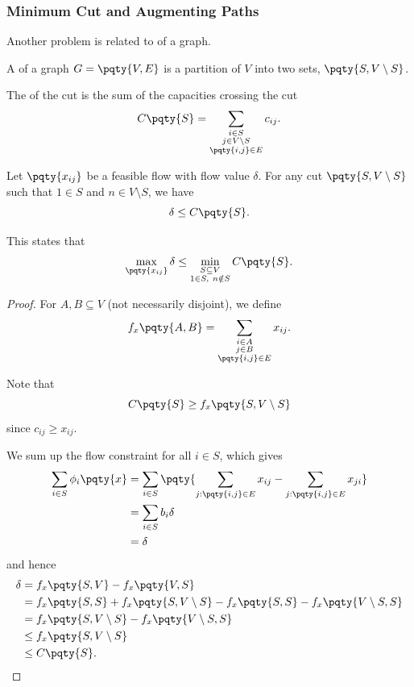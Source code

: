 \subsubsection{Minimum Cut and Augmenting Paths}

Another problem is related to  of a graph.

\begin{definition}
    A  of a graph \(G = \pqty{V, E}\) is a partition of \(V\) into two sets, \(\pqty{S, V \setminus S}\).
    
    The  of the cut is the sum of the capacities crossing the cut
    \[
        C\pqty{S} = \sum_{\substack{i \in S \\ j \in V \setminus S \\ \pqty{i, j} \in E}} c_{ij}.
    \]
\end{definition}

\begin{theorem}
    Let \(\pqty{x_{ij}}\) be a feasible flow with flow value \(\delta\). For any cut \(\pqty{S, V \setminus S}\) such that \(1 \in S\) and \(n \in V \setminus S\), we have
    \[
        \delta \leq C\pqty{S}.
    \]
\end{theorem}

\begin{remark}
    This states that
    \[
        \max_{\pqty{x_{ij}}} \delta \leq \min_{\substack{S \subseteq V \\ 1 \in S,\ n \notin S}} C\pqty{S}.
    \]
\end{remark}

\begin{proof}
    For \(A, B \subseteq V\) (not necessarily disjoint), we define
    \[
        f_x \pqty{A, B} = \sum_{\substack{i \in A \\ j \in B \\ \pqty{i, j} \in E}} x_{ij}.
    \]

    Note that
    \[
        C\pqty{S} \geq f_x \pqty{S, V \setminus S}
    \]
    since \(c_{ij} \geq x_{ij}\).

    We sum up the flow constraint for all \(i \in S\), which gives
    \begin{align*}
        \sum_{i \in S} \phi_i \pqty{x} &= \sum_{i \in S} \pqty{\sum_{j: \pqty{i, j} \in E} x_{ij} - \sum_{j: \pqty{i, j} \in E} x_{ji}} \\
        &= \sum_{i \in S} b_i \delta \\
        &= \delta
    \end{align*}
    and hence
    \begin{align*}
        \delta &= f_x \pqty{S, V} - f_x \pqty{V, S} \\
        &= f_x \pqty{S, S} + f_x \pqty{S, V \setminus S} - f_x \pqty{S, S} - f_x \pqty{V \setminus S, S} \\
        &= f_x \pqty{S, V \setminus S} - f_x \pqty{V \setminus S, S} \\
        &\leq f_x \pqty{S, V \setminus S} \\
        &\leq C \pqty{S}.
    \end{align*}
\end{proof}

